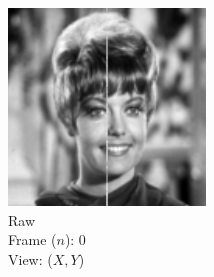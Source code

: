 \documentclass{osa-article}
\begin{document}
\begin{figure}
  \begin{subfigure}[t]{0.2\linewidth}
    \centering
    \includegraphics[width=\linewidth]{./figures/results/3D_python/no_drift_zelda/0/xy}\caption{Raw\\Frame (\(n\)): 0\\View: (\(X,Y\))}
  \end{subfigure}\hfill
  \begin{subfigure}[t]{0.2\linewidth}
    \centering

\end{subfigure}
\end{figure}
\end{document}
